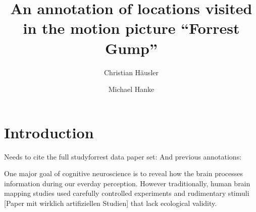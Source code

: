 \documentclass[10pt,a4paper,twocolumn]{article}
\begin{document}


\title{An annotation of locations visited in the motion picture ``Forrest Gump''}

\author[1]{Christian Häusler}
\author[1,2]{Michael Hanke}

\maketitle
\thispagestyle{fancy}

\begin{abstract}


\end{abstract}


\clearpage


\section*{Introduction}



Needs to cite the full studyforrest data paper set: \cite{HBI+14,HDH+2015,SKG+16,HAK+16}
And previous annotations: \cite{LRS+2015}

One major goal of cognitive neuroscience is to reveal how the brain
processes information during our everday perception. However traditionally,
human brain mapping studies used carefully controlled experiments
and rudimentary stimuli {[}Paper mit wirklich artifiziellen Studien{]}
that lack ecological validity. 
\end{document}

